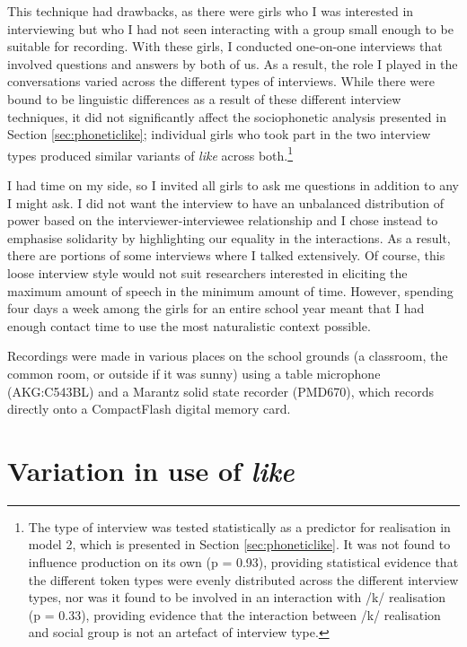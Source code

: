 This technique had drawbacks, as there were girls who I was interested in interviewing but who I had not seen interacting with a group small enough to be suitable for recording.  With these girls, I conducted one-on-one interviews that involved questions and answers by both of us.  As a result, the role I played in the conversations varied across the different types of interviews.  While there were bound to be linguistic differences as a result of these different interview techniques, it did not significantly affect the sociophonetic analysis presented in Section \ref{sec:phoneticlike}; individual girls who took part in the two interview types produced similar variants of \textit{like} across both.\footnote{The type of interview was tested statistically as a predictor for realisation in model 2, which is presented in Section \ref{sec:phoneticlike}. It was not found to influence production on its own (p = 0.93), providing statistical evidence that the different token types were evenly distributed across the different interview types, nor was it found to be involved in an interaction with /k/ realisation (p = 0.33), providing evidence that the interaction between /k/ realisation and social group is not an artefact of interview type.}  

I had time on my side, so I invited all girls to ask me questions in addition to any I might ask.  I did not want the interview to have an unbalanced distribution of power based on the interviewer-interviewee relationship and I chose instead to emphasise solidarity by highlighting our equality in the interactions.  As a result, there are portions of some interviews where I talked extensively.  Of course, this loose interview style would not suit researchers interested in eliciting the maximum amount of speech in the minimum amount of time.  However, spending four days a week among the girls for an entire school year meant that I had enough contact time to use the most naturalistic context possible.

Recordings were made in various places on the school grounds (a classroom, the common room, or outside if it was sunny) using a table microphone (AKG:C543BL) and a Marantz solid state recorder (PMD670), which records directly onto a CompactFlash digital memory card. 


\section{Variation in use of \textit{like}}\label{prod-like}


